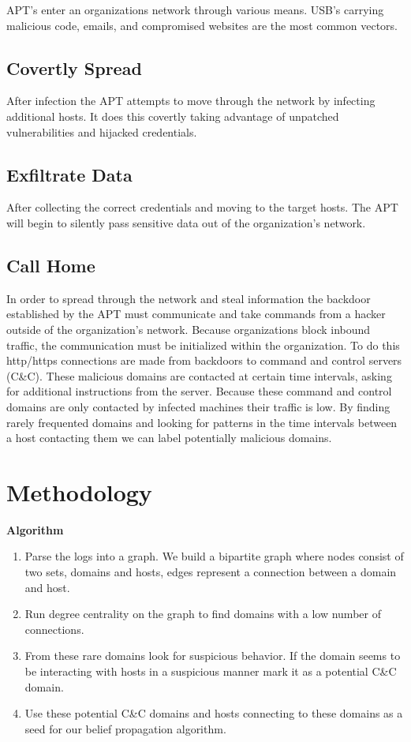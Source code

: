 \documentclass{article} %
\begin{document}
APT's enter an organizations network through various means. USB's carrying malicious code, emails, and compromised websites are the most common vectors. 

\subsection{Covertly Spread}
After infection the APT attempts to move through the network by infecting additional hosts. It does this covertly taking advantage of unpatched vulnerabilities and hijacked credentials.

\subsection{Exfiltrate Data}
After collecting the correct credentials and moving to the target hosts. The APT will begin to silently pass sensitive data out of the organization's network. 

\subsection{Call Home}
In order to spread through the network and steal information the backdoor established by the APT must communicate and take commands from a hacker outside of the organization's network. Because organizations block inbound traffic, the communication must be initialized within the organization. To do this http/https connections are made from backdoors to command and control servers (C\&C). These malicious domains are contacted at certain time intervals, asking for additional instructions from the server. Because these command and control domains are only contacted by infected machines their traffic is low. By finding rarely frequented domains and looking for patterns in the time intervals between a host contacting them we can label potentially malicious domains. 



\section{Methodology}
\label{method}

	\textbf{Algorithm}
	
	\begin{enumerate}
		
        \item Parse the logs into a graph. We build a bipartite graph where nodes consist of two sets, domains and hosts, edges represent a connection between a domain and host.
        \item Run degree centrality on the graph to find domains with a low number of connections.
        \item From these rare domains look for suspicious behavior. If the domain seems to be interacting with hosts in a suspicious manner mark it as a potential C\&C domain. 
        \item Use these potential C\&C domains and hosts connecting to these domains as a seed for our belief propagation algorithm.
    \end{enumerate}
\end{document}
